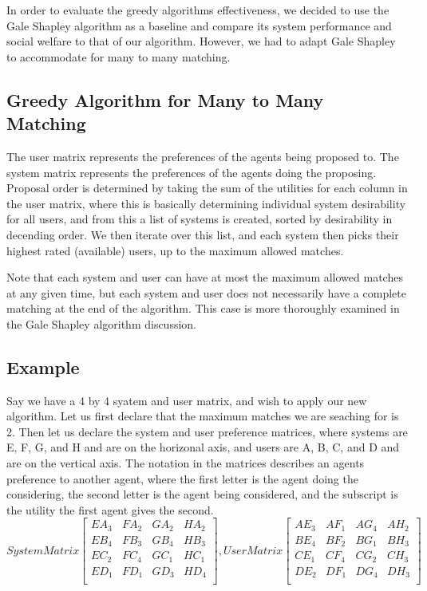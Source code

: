 \documentclass[11pt, letterpaper]{article}
\begin{document}
In order to evaluate the greedy algorithms effectiveness, we decided to use the Gale Shapley algorithm as a baseline and compare its system performance and social welfare to that of our algorithm.  However, we had to adapt Gale Shapley to accommodate for many to many matching. 

\subsection{Greedy Algorithm for Many to Many Matching}
The user matrix represents the preferences of the agents being proposed to.  The system matrix represents the preferences of the agents doing the proposing.  Proposal order is determined by taking the sum of the utilities for each column in the user matrix, where this is basically determining individual system desirability for all users, and from this a list of systems is created, sorted by desirability in decending order.  We then iterate over this list, and each system then picks their highest rated (available) users, up to the maximum allowed matches.  

Note that each system and user can have at most the maximum allowed matches at any given time, but each system and user does not necessarily have a complete matching at the end of the algorithm.  This case is more thoroughly examined in the Gale Shapley algorithm discussion.   

	\subsection{Example}
	Say we have a 4 by 4 syatem and user matrix, and wish to apply our new algorithm.  Let us first declare that the maximum matches we are seaching for is 2.  Then let us declare the system and user preference matrices, where systems are E, F, G, and H and are on the horizonal axis, and users are A, B, C, and D and are on the vertical axis.  The notation in the matrices describes an agents preference to another agent, where the first letter is the agent doing the considering, the second letter is the agent being considered, and the subscript is the utility the first agent gives the second. 
	\[
	System Matrix
	\begin{bmatrix}
		EA_{3} & FA_{2} & GA_{2} & HA_{2} \\
		EB_{4} & FB_{3} & GB_{4} & HB_{3} \\
		EC_{2} & FC_{4} & GC_{1} & HC_{1} \\
		ED_{1} & FD_{1} & GD_{3} & HD_{4} \\
	\end{bmatrix}
	, User Matrix
	\begin{bmatrix}
		AE_{3} & AF_{1} & AG_{4} & AH_{2} \\
		BE_{4} & BF_{2} & BG_{1} & BH_{3} \\
		CE_{1} & CF_{4} & CG_{2} & CH_{3} \\
		DE_{2} & DF_{1} & DG_{4} & DH_{3} \\
	\end{bmatrix}
	\]
\end{document}
